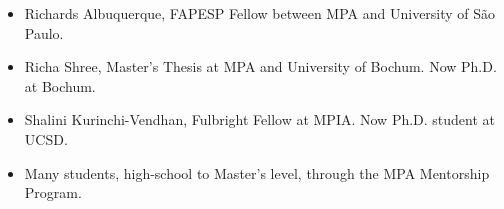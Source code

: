 \documentclass[a4paper,12pt,oneside]{article}
\begin{document}
\begin{itemize}[wide, labelwidth=!, labelindent=-11pt, noitemsep]
\end{itemize}

\noindent{}

\begin{itemize}[wide, labelwidth=!, labelindent=-11pt, noitemsep]
    \item Richards Albuquerque, FAPESP Fellow between MPA and University of S{\~a}o Paulo.
    \item Richa Shree, Master's Thesis at MPA and University of Bochum. Now Ph.D. at Bochum.
    \item Shalini Kurinchi-Vendhan, Fulbright Fellow at MPIA. Now Ph.D. student at UCSD.
    \item Many students, high-school to Master's level, through the MPA Mentorship Program.
\end{itemize}

\noindent{}
\end{document}
